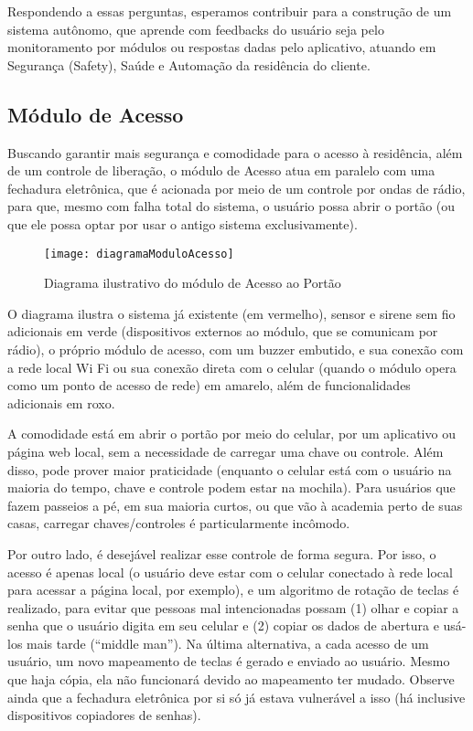 Respondendo a essas perguntas, esperamos contribuir para a construção de um sistema autônomo, que aprende com feedbacks do usuário seja pelo monitoramento por módulos ou respostas dadas pelo aplicativo, atuando em Segurança (Safety), Saúde e Automação da residência do cliente.

\subsection{Módulo de Acesso}
Buscando garantir mais segurança e comodidade para o acesso à residência, além de um controle de liberação, o módulo de Acesso atua em paralelo com uma fechadura eletrônica, que é acionada por meio de um controle por ondas de rádio, para que, mesmo com falha total do sistema, o usuário possa abrir o portão (ou que ele possa optar por usar o antigo sistema exclusivamente).

\begin{figure}[H]
	\centering
	\caption{Diagrama ilustrativo do módulo de Acesso ao Portão}
  \texttt{[image: diagramaModuloAcesso]}
\label{fig:diagramaModuloAcesso}
\end{figure}

O diagrama ilustra o sistema já existente (em vermelho), sensor e sirene sem fio adicionais em verde (dispositivos externos ao módulo, que se comunicam por rádio), o próprio módulo de acesso, com um buzzer embutido, e sua conexão com a rede local Wi Fi ou sua conexão direta com o celular (quando o módulo opera como um ponto de acesso de rede) em amarelo, além de funcionalidades adicionais em roxo.

A comodidade está em abrir o portão por meio do celular, por um aplicativo ou página web local, sem a necessidade de carregar uma chave ou controle. Além disso, pode prover maior praticidade (enquanto o celular está com o usuário na maioria do tempo, chave e controle podem estar na mochila). Para usuários que fazem passeios a pé, em sua maioria curtos, ou que vão à academia perto de suas casas, carregar chaves/controles é particularmente incômodo.

Por outro lado, é desejável realizar esse controle de forma segura. Por isso, o acesso é apenas local (o usuário deve estar com o celular conectado à rede local para acessar a página local, por exemplo), e um algoritmo de rotação de teclas é realizado, para evitar que pessoas mal intencionadas possam (1) olhar e copiar a senha que o usuário digita em seu celular e (2) copiar os dados de abertura e usá-los mais tarde (“middle man”). Na última alternativa, a cada acesso de um usuário, um novo mapeamento de teclas é gerado e enviado ao usuário. Mesmo que haja cópia, ela não funcionará devido ao mapeamento ter mudado. Observe ainda que a fechadura eletrônica por si só já estava vulnerável a isso (há inclusive dispositivos copiadores de senhas).

